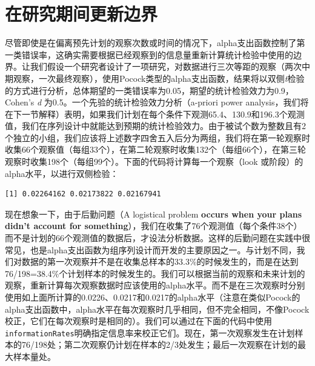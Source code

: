 \documentclass[
  letterpaper,
  DIV=11,
  numbers=noendperiod]{scrreprt}
\newenvironment{Shaded}{\begin{snugshade}}{\end{snugshade}}
\newcommand{\AttributeTok}[1]{\textcolor[rgb]{0.40,0.45,0.13}{#1}}
\newcommand{\DecValTok}[1]{\textcolor[rgb]{0.68,0.00,0.00}{#1}}
\newcommand{\FloatTok}[1]{\textcolor[rgb]{0.68,0.00,0.00}{#1}}
\newcommand{\FunctionTok}[1]{\textcolor[rgb]{0.28,0.35,0.67}{#1}}
\newcommand{\NormalTok}[1]{\textcolor[rgb]{0.00,0.23,0.31}{#1}}
\newcommand{\OtherTok}[1]{\textcolor[rgb]{0.00,0.23,0.31}{#1}}
\newcommand{\SpecialCharTok}[1]{\textcolor[rgb]{0.37,0.37,0.37}{#1}}
\newcommand{\StringTok}[1]{\textcolor[rgb]{0.13,0.47,0.30}{#1}}
\begin{document}
\hypertarget{ux5728ux7814ux7a76ux671fux95f4ux66f4ux65b0ux8fb9ux754c}{%
\section{在研究期间更新边界}\label{ux5728ux7814ux7a76ux671fux95f4ux66f4ux65b0ux8fb9ux754c}}

尽管即使是在偏离预先计划的观察次数或时间的情况下，alpha支出函数控制了第一类错误率，这确实需要根据已经观察到的信息量重新计算统计检验中使用的边界。让我们假设一个研究者设计了一项研究，对数据进行三次等距的观察（两次中期观察，一次最终观察），使用Pocock类型的alpha支出函数，结果将以双侧\emph{t}检验的方式进行分析，总体期望的一类错误率为0.05，期望的统计检验效力为0.9，Cohen's
\emph{d} 为0.5。一个先验的统计检验效力分析（a-priori power
analysis，我们将在下一节解释）表明，如果我们计划在每个条件下观测65.4、130.9和196.3个观测值，我们在序列设计中就能达到预期的统计检验效力。由于被试个数为整数且有2个独立的小组，我们应该将上述数字四舍五入后分为两组，我们将在第一轮观察时收集66个观察值（每组33个），在第二轮观察时收集132个（每组66个），在第三轮观察时收集198个（每组99个）。下面的代码将计算每一个观察（look
或阶段）的alpha水平，以进行双侧检验：

\begin{Shaded}
\end{Shaded}

\begin{verbatim}
[1] 0.02264162 0.02173822 0.02167941
\end{verbatim}

现在想象一下，由于后勤问题（A logistical problem \textbf{occurs when
your plans didn't account for
something}），我们在收集了76个观测值（每个条件38个）而不是计划的66个观测值的数据后，才设法分析数据。这样的后勤问题在实践中很常见，也是alpha支出函数为组序列设计而开发的主要原因之一。与计划不同，我们对数据的第一次观察并不是在收集总样本的33.3\%的时候发生的，而是在达到76/198=38.4\%个计划样本的时候发生的。我们可以根据当前的观察和未来计划的观察，重新计算每次观察数据时应该使用的alpha水平。而不是在三次观察时分别使用如上面所计算的0.0226、0.0217和0.0217的alpha水平（注意在类似Pocock的alpha支出函数中，alpha水平在每次观察时几乎相同，但不完全相同，不像Pocock校正，它们在每次观察时是相同的）。我们可以通过在下面的代码中使用\texttt{informationRates}明确指定信息率来校正它们。现在，第一次观察发生在计划样本的76/198处；第二次观察仍计划在样本的2/3处发生；最后一次观察在计划的最大样本量处。
\end{document}

